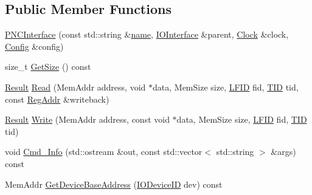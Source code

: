\subsection*{Public Member Functions}
\begin{DoxyCompactItemize}
\item 
\hyperlink{class_simulator_1_1drisc_1_1_i_o_interface_1_1_p_n_c_interface_a7caed0353c1f5d181706044e9e3b7796}{P\+N\+C\+Interface} (const std\+::string \&\hyperlink{mtconf_8c_a8f8f80d37794cde9472343e4487ba3eb}{name}, \hyperlink{class_simulator_1_1drisc_1_1_i_o_interface}{I\+O\+Interface} \&parent, \hyperlink{class_simulator_1_1_clock}{Clock} \&clock, \hyperlink{class_config}{Config} \&config)
\item 
size\+\_\+t \hyperlink{class_simulator_1_1drisc_1_1_i_o_interface_1_1_p_n_c_interface_a5ebaad256f5211965b666bf3f7481726}{Get\+Size} () const 
\item 
\hyperlink{namespace_simulator_a4b6b5616e7236c0c131516a441776805}{Result} \hyperlink{class_simulator_1_1drisc_1_1_i_o_interface_1_1_p_n_c_interface_a6e7e1f541f94c6ac65bbe909611a720c}{Read} (Mem\+Addr address, void $\ast$data, Mem\+Size size, \hyperlink{namespace_simulator_aaccbc706b2d6c99085f52f6dfc2333e4}{L\+F\+I\+D} fid, \hyperlink{namespace_simulator_a483cc4ecee1736e895054617672cded5}{T\+I\+D} tid, const \hyperlink{struct_simulator_1_1_reg_addr}{Reg\+Addr} \&writeback)
\item 
\hyperlink{namespace_simulator_a4b6b5616e7236c0c131516a441776805}{Result} \hyperlink{class_simulator_1_1drisc_1_1_i_o_interface_1_1_p_n_c_interface_a9dca9fcd96b2988c7004eee51924cbb1}{Write} (Mem\+Addr address, const void $\ast$data, Mem\+Size size, \hyperlink{namespace_simulator_aaccbc706b2d6c99085f52f6dfc2333e4}{L\+F\+I\+D} fid, \hyperlink{namespace_simulator_a483cc4ecee1736e895054617672cded5}{T\+I\+D} tid)
\item 
void \hyperlink{class_simulator_1_1drisc_1_1_i_o_interface_1_1_p_n_c_interface_a037c54c516a7ae24c8f6a6c57b98179c}{Cmd\+\_\+\+Info} (std\+::ostream \&out, const std\+::vector$<$ std\+::string $>$ \&args) const 
\item 
Mem\+Addr \hyperlink{class_simulator_1_1drisc_1_1_i_o_interface_1_1_p_n_c_interface_a9c2121de2341b820a60feb2b408108b5}{Get\+Device\+Base\+Address} (\hyperlink{namespace_simulator_a3493d987c866ad6b8aaa704c42502db0}{I\+O\+Device\+I\+D} dev) const 
\end{DoxyCompactItemize}


